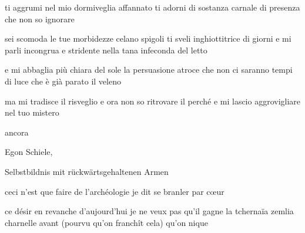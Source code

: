 \begin{poem}
	\begin{stanza}
		ti aggrumi\verseline
		nel mio dormiveglia affannato\verseline
		ti adorni di sostanza carnale\verseline
		di presenza che non so ignorare
	\end{stanza}

	\begin{stanza}
		sei scomoda\verseline
		le tue morbidezze celano spigoli\verseline
		ti sveli inghiottitrice di giorni\verseline
		e mi parli incongrua e stridente\verseline
		nella tana infeconda del letto
	\end{stanza}

	\begin{stanza}
		e mi abbaglia\verseline
		più chiara del sole la persuasione atroce\verseline
		che non ci saranno tempi di luce\verseline
		che è già parato il veleno
	\end{stanza}

	\begin{stanza}
		ma mi tradisce il risveglio\verseline
		e ora non so ritrovare il perché\verseline
		e mi lascio aggrovigliare\verseline
		nel tuo mistero
	\end{stanza}

	\begin{stanza}
		ancora
	\end{stanza}
\end{poem}

\clearpage


\begin{artItem}
	Egon Schiele, \begin{otherlanguage}{german}%
		Selbstbildnis mit rückwärtsgehaltenen Armen%
	\end{otherlanguage}
\end{artItem}

\begin{poem}
	\begin{otherlanguage}{french}
		\begin{stanza}
			ceci n'est que faire\verseline
			de l'archéologie\verseline
			je dit se branler\verseline
			par cœur
		\end{stanza}

		\begin{stanza}
			ce désir en revanche\verseline
			d'aujourd'hui\verseline
			je ne veux pas qu'il gagne\verseline
			la tchernaïa zemlia charnelle\verseline
			avant\verseline
			(pourvu qu'on franchît cela)\verseline
			qu'on nique
		\end{stanza}
	\end{otherlanguage}
\end{poem}


